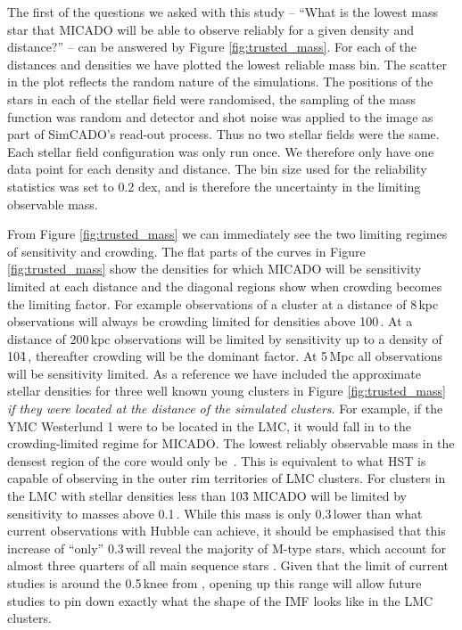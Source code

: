The first of the questions we asked with this study -- ``What is the lowest mass star that MICADO will be able to observe reliably for a given density and distance?'' -- can be answered by Figure \ref{fig:trusted_mass}. For each of the distances and densities we have plotted the lowest reliable mass bin. The scatter in the plot reflects the random nature of the simulations. The positions of the stars in each of the stellar field were randomised, the sampling of the mass function was random and detector and shot noise was applied to the image as part of SimCADO's read-out process. Thus no two stellar fields were the same. Each stellar field configuration was only run once. We therefore only have one data point for each density and distance. The bin size used for the reliability statistics was set to 0.2 dex, and is therefore the uncertainty in the limiting observable mass. 

From Figure \ref{fig:trusted_mass} we can immediately see the two limiting regimes of sensitivity and crowding. The flat parts of the curves in Figure \ref{fig:trusted_mass} show the densities for which MICADO will be sensitivity limited at each distance and the diagonal regions show when crowding becomes the limiting factor. For example observations of a cluster at a distance of 8\,kpc observations will always be crowding limited for densities above 100\,\spae. At a distance of 200\,kpc observations will be limited by sensitivity up to a density of 10\h4\,\spa, thereafter crowding will be the dominant factor. At 5\,Mpc all observations will be sensitivity limited. As a reference we have included the approximate stellar densities for three well known young clusters in Figure \ref{fig:trusted_mass} \textit{if they were located at the distance of the simulated clusters}. For example, if the YMC Westerlund 1 were to be located in the LMC, it would fall in to the crowding-limited regime for MICADO. The lowest reliably observable mass in the densest region of the core would only be \,\msun. This is equivalent to what HST is capable of observing in the outer rim territories of LMC clusters. For clusters in the LMC with stellar densities less than 10\h3 MICADO will be limited by sensitivity to masses above 0.1\,\msun. While this mass is only 0.3\,\msun lower than what current observations with Hubble can achieve, it should be emphasised that this increase of ``only'' 0.3\,\msun will reveal the majority of M-type stars, which account for almost three quarters of all main sequence stars \citep{ledrew2001}. Given that the limit of current studies is around the 0.5\,\msun knee from \citet{kroupa2001}, opening up this range will allow future studies to pin down exactly what the shape of the IMF looks like in the LMC clusters. 

